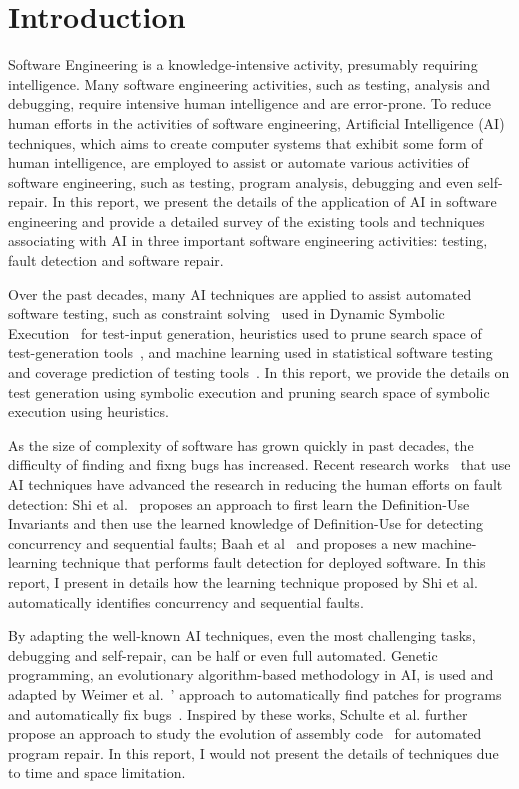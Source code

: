\section{Introduction} 
Software Engineering is a knowledge-intensive activity, presumably requiring intelligence. Many software engineering activities, such as testing, analysis and debugging, require intensive human intelligence and are error-prone. To reduce human efforts in the activities of software engineering, Artificial Intelligence (AI) techniques, which aims to create computer systems that exhibit some form of human intelligence, are employed to assist or automate various activities of software engineering, such as testing, program analysis, debugging and even self-repair. In this report, we present the details of the application of AI in software engineering and provide a detailed survey of the existing tools and techniques associating with AI in three important software engineering activities: testing, fault detection and software repair.

Over the past decades, many AI techniques are applied to assist automated software testing, such as constraint solving~\cite{constraintsolving} used in Dynamic Symbolic Execution~\cite{symbolic, dart, cute} for test-input generation, heuristics used to prune search space of test-generation tools~\cite{prune,fitness}, and machine learning used in statistical software testing~\cite{mlinstatistics} and coverage prediction of testing tools~\cite{predictCoverage}. In this report, we provide the details on test generation using symbolic execution and pruning search space of symbolic execution using heuristics.

As the size of complexity of software has grown quickly in past decades, the difficulty of finding and fixng bugs has increased. Recent research works~\cite{wrongDefinition,online} that use AI techniques have advanced the research in reducing the human efforts on fault detection: Shi et al.~\cite{wrongDefinition} proposes an approach to first learn the Definition-Use Invariants and then use the learned knowledge of Definition-Use for detecting concurrency and sequential faults; Baah et al~\cite{online} and proposes a new machine-learning technique that performs fault detection for deployed software. In this report, I present in details how the learning technique proposed by Shi et al. automatically identifies concurrency and sequential faults.

By adapting the well-known AI techniques, even the most challenging tasks, debugging and self-repair, can be half or even full automated. Genetic programming, an evolutionary algorithm-based methodology in AI, is used and adapted by Weimer et al.~\cite{geneticPatch}' approach to automatically find patches for programs and automatically fix bugs~\cite{repair}. Inspired by these works, Schulte et al. further propose an approach to study the evolution of assembly code~\cite{evolutionaryComputation} for automated program repair. In this report, I would not present the details of techniques due to time and space limitation.



